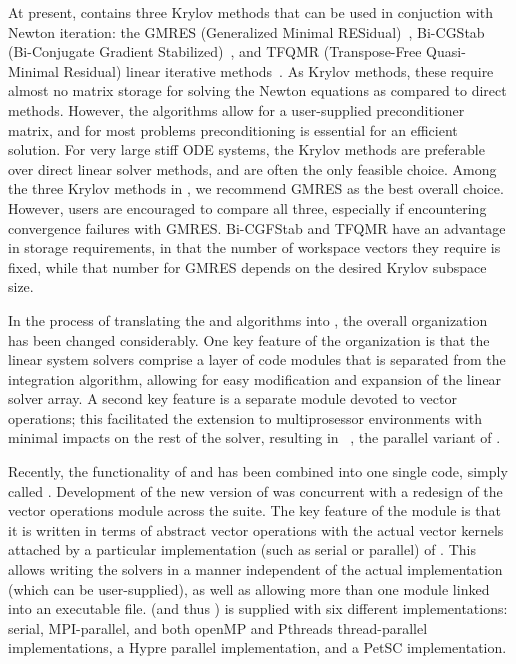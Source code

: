 At present, {\cvode} contains three Krylov methods that can be used
in conjuction with Newton iteration:
the GMRES (Generalized Minimal RESidual)~\cite{SaSc:86},
Bi-CGStab (Bi-Conjugate Gradient Stabilized)~\cite{Van:92}, and
TFQMR (Transpose-Free Quasi-Minimal Residual) linear iterative 
methods~\cite{Fre:93}.  As Krylov methods, these require almost no 
matrix storage for solving the Newton equations as compared to direct 
methods. However, the algorithms allow for a user-supplied preconditioner
matrix, and for most problems preconditioning is essential for an
efficient solution.
For very large stiff ODE systems, the Krylov methods are preferable over
direct linear solver methods, and are often the only feasible choice.
Among the three Krylov methods in {\cvode}, we recommend GMRES as the
best overall choice.  However, users are encouraged to compare all
three, especially if encountering convergence failures with GMRES.
Bi-CGFStab and TFQMR have an advantage in storage requirements, in
that the number of workspace vectors they require is fixed, while that
number for GMRES depends on the desired Krylov subspace size.

In the process of translating the {\vode} and {\vodpk} algorithms into
{\CC}, the overall {\cvode} organization has been changed considerably.
One key feature of the {\cvode} organization is that the linear system
solvers comprise a layer of code modules that is separated from the
integration algorithm, allowing for easy modification and expansion of
the linear solver array.  A second key feature is a separate module
devoted to vector operations; this facilitated the extension to
multiprosessor environments with minimal impacts on the rest of the
solver, resulting in {\pvode}~\cite{ByHi:99},
the parallel variant of {\cvode}.  

 Recently,
the functionality of {\cvode} and {\pvode} has been combined into one
single code, simply called {\cvode}. Development of the new version of
{\cvode} was concurrent with a redesign of the vector operations
module across the {\sundials} suite. The key feature of the
{\nvector} module is that it is written in terms of abstract vector
operations with the actual vector kernels attached by a particular
implementation (such as serial or parallel) of {\nvector}. This allows
writing the {\sundials} solvers in a manner independent of the actual
{\nvector} implementation (which can be user-supplied), as well as
allowing more than one {\nvector} module linked into an executable file.
{\sundials} (and thus {\cvode}) is supplied with six different {\nvector}
implementations:
serial, MPI-parallel, and both openMP and Pthreads thread-parallel
{\nvector} implementations, a Hypre parallel implementation,
and a PetSC implementation.

